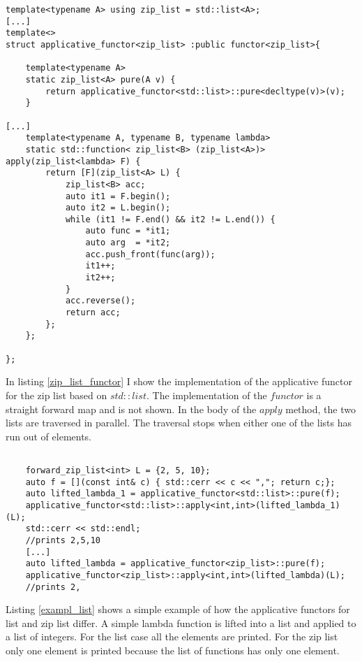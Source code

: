 \documentclass[12pt,fleqn]{article}
\begin{document}
%
%
\begin{minipage}{\linewidth}
\begin{lstlisting}[caption=ziplist is an applicative functor, label=zip_list_functor]
template<typename A> using zip_list = std::list<A>;
[...]
template<> 
struct applicative_functor<zip_list> :public functor<zip_list>{

    template<typename A>
    static zip_list<A> pure(A v) {
		return applicative_functor<std::list>::pure<decltype(v)>(v);
    }

[...]
    template<typename A, typename B, typename lambda>
    static std::function< zip_list<B> (zip_list<A>)> apply(zip_list<lambda> F) {
		return [F](zip_list<A> L) {
			zip_list<B> acc;
			auto it1 = F.begin();
			auto it2 = L.begin();
			while (it1 != F.end() && it2 != L.end()) {
				auto func = *it1;
				auto arg  = *it2;
				acc.push_front(func(arg));
				it1++;
				it2++;
			}
			acc.reverse();
			return acc;
		};
	};
	
};
\end{lstlisting}
\end{minipage}
%
%
%

In listing \ref{zip_list_functor} I show the implementation of the applicative functor for the zip list based on $std::list$. 
The implementation of the $functor$ is  a straight forward map and is not shown. 
In the body of the $apply$ method, the two lists are traversed in parallel. The traversal stops when either one of the lists has run out of elements.


%
%
%
\begin{minipage}{\linewidth}
\begin{lstlisting}[caption=the applicative functor for list and ziplist, label=exampl_list]

	forward_zip_list<int> L = {2, 5, 10};
	auto f = [](const int& c) { std::cerr << c << ","; return c;};
	auto lifted_lambda_1 = applicative_functor<std::list>::pure(f);
	applicative_functor<std::list>::apply<int,int>(lifted_lambda_1)(L);
	std::cerr << std::endl;
    //prints 2,5,10
    [...]
	auto lifted_lambda = applicative_functor<zip_list>::pure(f);
	applicative_functor<zip_list>::apply<int,int>(lifted_lambda)(L);
    //prints 2,
\end{lstlisting}
\end{minipage}
%
%
%

Listing \ref{exampl_list} shows a simple example of how the applicative functors for list and zip list differ. 
A simple lambda function is lifted into a list and applied to a list of integers. 
For the list case all the elements are printed. For the zip list only one element is printed because the list of functions has only one element.
   
\end{document}
